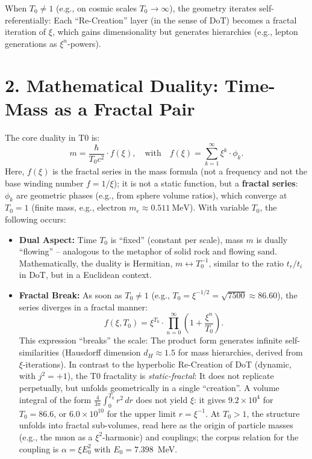 	\begin{important}
		When \( T_0 \neq 1 \) (e.g., on cosmic scales \( T_0 \to \infty \)), the geometry iterates self-referentially: Each ``Re-Creation'' layer (in the sense of DoT) becomes a fractal iteration of \( \xi \), which gains dimensionality but generates hierarchies (e.g., lepton generations as \( \xi^n \)-powers).
	\end{important}
	
	\section*{2. Mathematical Duality: Time-Mass as a Fractal Pair}
	The core duality in T0 is:
	\[
	m = \frac{\hbar}{T_0 c^2} \cdot f(\xi), \quad \text{with} \quad f(\xi) = \sum_{k=1}^\infty \xi^k \cdot \phi_k.
	\]
	Here, \( f(\xi) \) is the fractal series in the mass formula (not a frequency and not the base winding number \( f = 1/\xi \)); it is not a static function, but a \textbf{fractal series}: \( \phi_k \) are geometric phases (e.g., from sphere volume ratios), which converge at \( T_0 = 1 \) (finite mass, e.g., electron \( m_e \approx \SI{0.511}{\mega\electronvolt}\)). With variable \( T_0 \), the following occurs:
	\begin{itemize}
		\item \textbf{Dual Aspect:} Time \( T_0 \) is ``fixed'' (constant per scale), mass \( m \) is dually ``flowing'' – analogous to the metaphor of solid rock and flowing sand. Mathematically, the duality is Hermitian, \( m \leftrightarrow T_0^{-1} \), similar to the ratio \( t_r / t_i \) in DoT, but in a Euclidean context.
		\item \textbf{Fractal Break:} As soon as \( T_0 \neq 1 \) (e.g., \( T_0 = \xi^{-1/2} = \sqrt{7500} \approx 86.60 \)), the series diverges in a fractal manner:
		\[
		f(\xi, T_0) = \xi^{T_0} \cdot \prod_{n=0}^\infty \left(1 + \frac{\xi^n}{T_0}\right).
		\]
		This expression ``breaks'' the scale: The product form generates infinite self-similarities (Hausdorff dimension \( d_H \approx 1.5 \) for mass hierarchies, derived from \( \xi \)-iterations). In contrast to the hyperbolic Re-Creation of DoT (dynamic, with \( j^2 = +1 \)), the T0 fractality is \emph{static-fractal}: It does not replicate perpetually, but unfolds geometrically in a single ``creation''. A volume integral of the form \( \frac{4}{3\pi}\int_0^{T_0} r^2\,dr \) does not yield \( \xi \): it gives \( 9.2\times10^4 \) for \( T_0 = 86.6 \), or \( 6.0\times10^{10} \) for the upper limit \( r = \xi^{-1} \).
		At \( T_0 > 1 \), the structure unfolds into fractal sub-volumes, read here as the origin of particle masses (e.g., the muon as a \( \xi^2 \)-harmonic) and couplings; the corpus relation for the coupling is \( \alpha = \xi E_0^2 \) with \( E_0 = 7.398 \)~MeV.
	\end{itemize}

